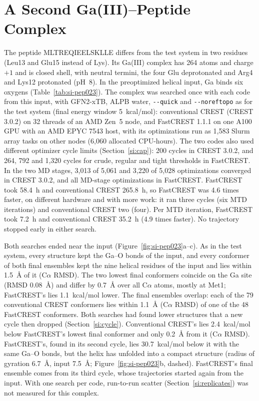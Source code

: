 \documentclass[journal=jctcce,manuscript=suppinfo]{achemso}
\newcommand{\quickflag}{\texttt{-{}-quick}}
\begin{document}
\section{A Second Ga(III)--Peptide Complex}
\label{si:ga2}

The peptide \mbox{MLTREQIEELSKLLE} differs from the test system in two residues (Leu13 and Glu15 instead of Lys). Its Ga(III)
complex has 264 atoms and charge $+1$ and is closed shell, with neutral termini, the four Glu deprotonated and Arg4 and
Lys12 protonated (pH~8). In the preoptimized helical input, Ga binds six oxygens (Table~\ref{tab:si-pep023}). The complex
was searched once with each code from this input, with GFN2-xTB, ALPB water, \quickflag{} and \texttt{-{}-noreftopo} as
for the test system (final energy window 5~kcal/mol): conventional CREST (CREST 3.0.2) on 32 threads of an AMD Zen~5
node, and FastCREST 1.1.1 on one A100 GPU with an AMD EPYC 7543 host, with its optimizations run as 1,583 Slurm array
tasks on other nodes (6,060 allocated CPU-hours).
The two codes also used different optimizer cycle limits (Section~\ref{si:cap}): 200 cycles in CREST 3.0.2, and 264, 792
and 1,320 cycles for crude, regular and tight thresholds in FastCREST. In the two MD stages, 3,013 of 5,061 and 3,220 of
5,028 optimizations converged in CREST 3.0.2, and all MD-stage optimizations in FastCREST.
FastCREST took 58.4~h and conventional CREST 265.8~h, so FastCREST was 4.6 times faster, on different hardware and with
more work: it ran three cycles (six MTD iterations) and conventional CREST two (four). Per MTD iteration, FastCREST took
7.2~h and conventional CREST 35.2~h (4.9 times faster). No trajectory stopped early in either search.

Both searches ended near the input (Figure~\ref{fig:si-pep023}a--c). As in the test system, every structure kept the
Ga--O bonds of the input, and every conformer of both final ensembles kept the nine helical residues of the input and
lies within 1.5~\AA{} of it (C$\alpha$ RMSD). The two lowest final conformers coincide on the Ga site (RMSD 0.08~\AA) and
differ by 0.7~\AA{} over all C$\alpha$ atoms, mostly at Met1; FastCREST's lies 1.1~kcal/mol lower. The final ensembles
overlap: each of the 79 conventional CREST conformers lies within 1.1~\AA{} (C$\alpha$ RMSD) of one of the 48 FastCREST
conformers. Both searches had found lower structures that a new cycle then dropped (Section~\ref{si:cycle}). Conventional
CREST's lies 2.4~kcal/mol below FastCREST's lowest final conformer and only 0.2~\AA{} from it (C$\alpha$ RMSD).
FastCREST's, found in its second cycle, lies 30.7~kcal/mol below it with the same Ga--O bonds, but the helix has
unfolded into a compact structure (radius of gyration 6.7~\AA, input 7.5~\AA; Figure~\ref{fig:si-pep023}b, dashed).
FastCREST's final ensemble comes from its third cycle, whose trajectories started again from the input. With one search
per code, run-to-run scatter (Section~\ref{si:replicates}) was not measured for this complex.
\end{document}
